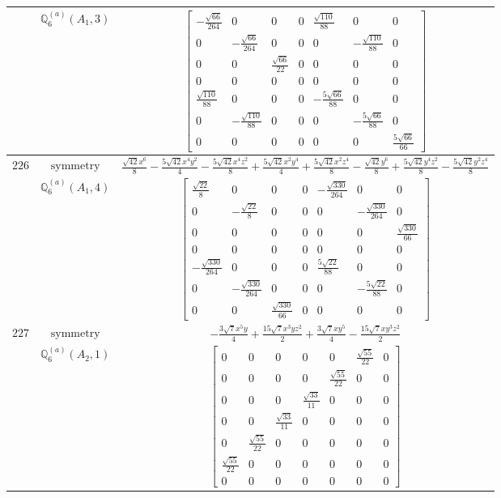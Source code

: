 \documentclass[fleqn,8pt,landscape]{jsarticle}
\begin{document}
\begin{longtable}{ccc}
$  $ & $ \mathbb{Q}_{6}^{(a)}(A_{1},3) $ & $ \begin{bmatrix} - \frac{\sqrt{66}}{264} & 0 & 0 & 0 & \frac{\sqrt{110}}{88} & 0 & 0 \\ 0 & - \frac{\sqrt{66}}{264} & 0 & 0 & 0 & - \frac{\sqrt{110}}{88} & 0 \\ 0 & 0 & \frac{\sqrt{66}}{22} & 0 & 0 & 0 & 0 \\ 0 & 0 & 0 & 0 & 0 & 0 & 0 \\ \frac{\sqrt{110}}{88} & 0 & 0 & 0 & - \frac{5 \sqrt{66}}{88} & 0 & 0 \\ 0 & - \frac{\sqrt{110}}{88} & 0 & 0 & 0 & - \frac{5 \sqrt{66}}{88} & 0 \\ 0 & 0 & 0 & 0 & 0 & 0 & \frac{5 \sqrt{66}}{66} \end{bmatrix} $ \\ \hline
$ 226 $ & $ \text{symmetry} $ & $ \frac{\sqrt{42} x^{6}}{8} - \frac{5 \sqrt{42} x^{4} y^{2}}{4} - \frac{5 \sqrt{42} x^{4} z^{2}}{8} + \frac{5 \sqrt{42} x^{2} y^{4}}{4} + \frac{5 \sqrt{42} x^{2} z^{4}}{8} - \frac{\sqrt{42} y^{6}}{8} + \frac{5 \sqrt{42} y^{4} z^{2}}{8} - \frac{5 \sqrt{42} y^{2} z^{4}}{8} $ \\
$  $ & $ \mathbb{Q}_{6}^{(a)}(A_{1},4) $ & $ \begin{bmatrix} \frac{\sqrt{22}}{8} & 0 & 0 & 0 & - \frac{\sqrt{330}}{264} & 0 & 0 \\ 0 & - \frac{\sqrt{22}}{8} & 0 & 0 & 0 & - \frac{\sqrt{330}}{264} & 0 \\ 0 & 0 & 0 & 0 & 0 & 0 & \frac{\sqrt{330}}{66} \\ 0 & 0 & 0 & 0 & 0 & 0 & 0 \\ - \frac{\sqrt{330}}{264} & 0 & 0 & 0 & \frac{5 \sqrt{22}}{88} & 0 & 0 \\ 0 & - \frac{\sqrt{330}}{264} & 0 & 0 & 0 & - \frac{5 \sqrt{22}}{88} & 0 \\ 0 & 0 & \frac{\sqrt{330}}{66} & 0 & 0 & 0 & 0 \end{bmatrix} $ \\ \hline
$ 227 $ & $ \text{symmetry} $ & $ - \frac{3 \sqrt{7} x^{5} y}{4} + \frac{15 \sqrt{7} x^{3} y z^{2}}{2} + \frac{3 \sqrt{7} x y^{5}}{4} - \frac{15 \sqrt{7} x y^{3} z^{2}}{2} $ \\
$  $ & $ \mathbb{Q}_{6}^{(a)}(A_{2},1) $ & $ \begin{bmatrix} 0 & 0 & 0 & 0 & 0 & \frac{\sqrt{55}}{22} & 0 \\ 0 & 0 & 0 & 0 & \frac{\sqrt{55}}{22} & 0 & 0 \\ 0 & 0 & 0 & \frac{\sqrt{33}}{11} & 0 & 0 & 0 \\ 0 & 0 & \frac{\sqrt{33}}{11} & 0 & 0 & 0 & 0 \\ 0 & \frac{\sqrt{55}}{22} & 0 & 0 & 0 & 0 & 0 \\ \frac{\sqrt{55}}{22} & 0 & 0 & 0 & 0 & 0 & 0 \\ 0 & 0 & 0 & 0 & 0 & 0 & 0 \end{bmatrix} $ \\ \hline

\end{longtable}
\end{document}
